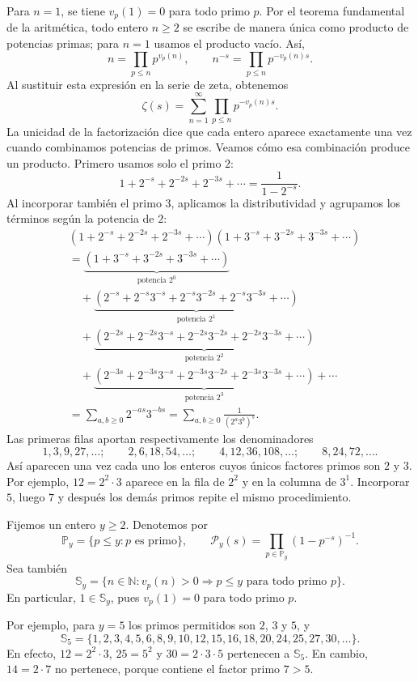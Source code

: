 \documentclass[11pt,a4paper]{article}
\begin{document}
Para $n=1$, se tiene $v_p(1)=0$ para todo primo $p$. Por el teorema
fundamental de la aritmética, todo entero $n\ge2$ se escribe de manera única
como producto de potencias primas; para $n=1$ usamos el producto vacío. Así,
\[
  n=\prod_{p\le n}p^{v_p(n)},\qquad
  n^{-s}=\prod_{p\le n}p^{-v_p(n)s}.
\]
Al sustituir esta expresión en la serie de zeta, obtenemos
\[
  \zeta(s)=\sum_{n=1}^{\infty}\prod_{p\le n}p^{-v_p(n)s}.
\]
La unicidad de la factorización dice que cada entero aparece exactamente una vez
cuando combinamos potencias de primos. Veamos cómo esa combinación produce un
producto. Primero usamos solo el primo $2$:
\[
  1+2^{-s}+2^{-2s}+2^{-3s}+\cdots=\frac{1}{1-2^{-s}}.
\]
Al incorporar también el primo $3$, aplicamos la distributividad y agrupamos
los términos según la potencia de $2$:
\begin{align*}
 &(1+2^{-s}+2^{-2s}+2^{-3s}+\cdots)
   (1+3^{-s}+3^{-2s}+3^{-3s}+\cdots)\\
 &=\underbrace{(1+3^{-s}+3^{-2s}+3^{-3s}+\cdots)}_{\text{potencia }2^0}\\
 &\quad+\underbrace{(2^{-s}+2^{-s}3^{-s}+2^{-s}3^{-2s}+2^{-s}3^{-3s}+\cdots)}_{\text{potencia }2^1}\\
 &\quad+\underbrace{(2^{-2s}+2^{-2s}3^{-s}+2^{-2s}3^{-2s}+2^{-2s}3^{-3s}+\cdots)}_{\text{potencia }2^2}\\
 &\quad+\underbrace{(2^{-3s}+2^{-3s}3^{-s}+2^{-3s}3^{-2s}+2^{-3s}3^{-3s}+\cdots)}_{\text{potencia }2^3}+\cdots\\
 &=\sum_{a,b\ge0}2^{-as}3^{-bs}
  =\sum_{a,b\ge0}\frac{1}{(2^a3^b)^s}.
\end{align*}
Las primeras filas aportan respectivamente los denominadores
\[
  1,3,9,27,\ldots;\qquad 2,6,18,54,\ldots;\qquad
  4,12,36,108,\ldots;\qquad 8,24,72,\ldots.
\]
Así aparecen una vez cada uno los enteros cuyos únicos factores primos son
$2$ y $3$. Por ejemplo, $12=2^2\cdot3$ aparece en la fila de $2^2$ y en la
columna de $3^1$. Incorporar $5$, luego $7$ y después los demás primos repite
el mismo procedimiento.

Fijemos un entero $y\ge2$. Denotemos por
\[
  \mathbb{P}_y=\{p\le y:p\text{ es primo}\},\qquad
  \mathscr{P}_y(s)=\prod_{p\in\mathbb{P}_y}(1-p^{-s})^{-1}.
\]
Sea también
\[
  \mathbb{S}_y=\{n\in\mathbb{N}: v_p(n)>0\Rightarrow p\le y
  \text{ para todo primo }p\}.
\]
En particular, $1\in\mathbb{S}_y$, pues $v_p(1)=0$ para todo primo $p$.

Por ejemplo, para $y=5$ los primos permitidos son $2$, $3$ y $5$, y
\[
  \mathbb{S}_5=\{1,2,3,4,5,6,8,9,10,12,15,16,18,20,24,25,27,30,\ldots\}.
\]
En efecto, $12=2^2\cdot3$, $25=5^2$ y $30=2\cdot3\cdot5$ pertenecen a
$\mathbb{S}_5$. En cambio, $14=2\cdot7$ no pertenece, porque contiene el
factor primo $7>5$.
\end{document}
